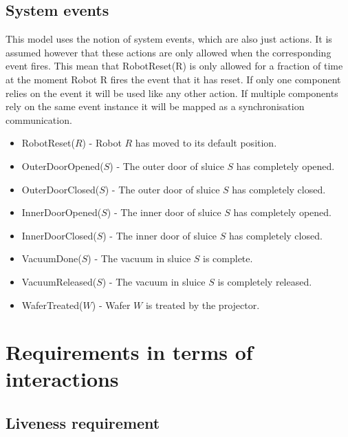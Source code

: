 \documentclass[12pt]{report}
\begin{document}
	\section{System events}
	This model uses the notion of system events, which are also just actions. It is assumed however that these
	actions are only allowed when the corresponding event fires. This mean that RobotReset(R) is only allowed for a fraction of time at the moment Robot R fires the event that it has reset. If only one component relies on the event it will be used like any other action. If multiple components rely on the same event instance it will be mapped as a synchronisation communication.
	\begin{itemize}
\item RobotReset($R$) - Robot $R$ has moved to its default position.
\item OuterDoorOpened($S$) - The outer door of sluice $S$ has completely opened.
\item OuterDoorClosed($S$) - The outer door of sluice $S$ has completely closed.
\item InnerDoorOpened($S$) - The inner door of sluice $S$ has completely opened.
\item InnerDoorClosed($S$) - The inner door of sluice $S$ has completely closed.
\item VacuumDone($S$) - The vacuum in sluice $S$ is complete.
\item VacuumReleased($S$) - The vacuum in sluice $S$ is completely released.
\item WaferTreated($W$) - Wafer $W$ is treated by the projector.
	\end{itemize}
	
	\chapter{Requirements in terms of interactions}

	\section{Liveness requirement}
	\begin{itemize}
	\end{itemize}
\end{document}
